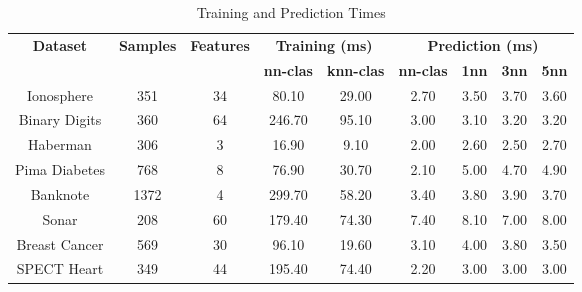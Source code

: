 \begin{table}[H]
\centering
\begin{tabular}{|c|c|c|c|c|c|c|c|c|}
\hline
\multirow{2}{*}{\textbf{Dataset}} & \multirow{2}{*}{\textbf{Samples}} & \multirow{2}{*}{\textbf{Features}} & \multicolumn{2}{c|}{\textbf{Training (ms)}} & \multicolumn{4}{c|}{\textbf{Prediction (ms)}} \\ \cline{4-9}
 & & & \textbf{nn-clas} & \textbf{knn-clas} & \textbf{nn-clas} & \textbf{1nn} & \textbf{3nn} & \textbf{5nn} \\ \hline
Ionosphere & 351 & 34 & 80.10 & 29.00 & 2.70 & 3.50 & 3.70 & 3.60 \\ \hline
Binary Digits & 360 & 64 & 246.70 & 95.10 & 3.00 & 3.10 & 3.20 & 3.20 \\ \hline
Haberman & 306 & 3 & 16.90 & 9.10 & 2.00 & 2.60 & 2.50 & 2.70 \\ \hline
Pima Diabetes & 768 & 8 & 76.90 & 30.70 & 2.10 & 5.00 & 4.70 & 4.90 \\ \hline
Banknote & 1372 & 4 & 299.70 & 58.20 & 3.40 & 3.80 & 3.90 & 3.70 \\ \hline
Sonar & 208 & 60 & 179.40 & 74.30 & 7.40 & 8.10 & 7.00 & 8.00 \\ \hline
Breast Cancer & 569 & 30 & 96.10 & 19.60 & 3.10 & 4.00 & 3.80 & 3.50 \\ \hline
SPECT Heart & 349 & 44 & 195.40 & 74.40 & 2.20 & 3.00 & 3.00 & 3.00 \\ \hline
\end{tabular}
\caption{Training and Prediction Times}
\label{tab:timing}
\end{table}